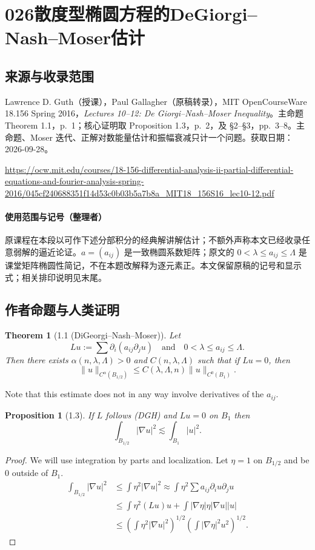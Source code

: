 \documentclass[UTF8,11pt]{ctexart}
\newtheorem*{theorem}{Theorem}
\newtheorem*{proposition}{Proposition}
\theoremstyle{definition}
\begin{document}
\section*{026\quad 散度型椭圆方程的DeGiorgi--Nash--Moser估计}
\subsection*{来源与收录范围}
Lawrence D. Guth（授课），Paul Gallagher（原稿转录），MIT OpenCourseWare 18.156 Spring 2016，\emph{Lectures 10--12: De Giorgi--Nash--Moser Inequality}。主命题 Theorem 1.1，p.~1；核心证明取 Proposition 1.3，p.~2，及 \S2--\S3，pp.~3--8。主命题、Moser 迭代、正解对数能量估计和振幅衰减只计一个问题。获取日期：2026-09-28。
\par\url{https://ocw.mit.edu/courses/18-156-differential-analysis-ii-partial-differential-equations-and-fourier-analysis-spring-2016/045cf240688351f14d53c0b03b5a7b8a_MIT18_156S16_lec10-12.pdf}
\paragraph{使用范围与记号（整理者）} 原课程在本段以可作下述分部积分的经典解讲解估计；不额外声称本文已经收录任意弱解的逼近论证。$a=(a_{ij})$ 是一致椭圆系数矩阵；原文的 $0<\lambda\leq a_{ij}\leq\Lambda$ 是课堂矩阵椭圆性简记，不在本题改解释为逐元素正。本文保留原稿的记号和显示式；相关排印说明见末尾。
\subsection*{作者命题与人类证明}
\begin{theorem}[1.1 (DiGeorgi--Nash--Moser)]
Let
\[Lu:=\sum\partial_i(a_{ij}\partial_j u)\quad\text{and}\quad0<\lambda\leq a_{ij}\leq\Lambda.\tag{DGH}\]
Then there exists $\alpha(n,\lambda,\Lambda)>0$ and $C(n,\lambda,\Lambda)$ such that if $Lu=0$, then
\[\|u\|_{C^\alpha(B_{1/2})}\leq C(\lambda,\Lambda,n)\|u\|_{C^0(B_1)}.\]
\end{theorem}
Note that this estimate does not in any way involve derivatives of the $a_{ij}$.
\begin{proposition}[1.3]
If $L$ follows (DGH) and $Lu=0$ on $B_1$ then
\[\int_{B_{1/2}}|\nabla u|^2\lesssim\int_{B_1}|u|^2.\]
\end{proposition}
\begin{proof}
We will use integration by parts and localization. Let $\eta=1$ on $B_{1/2}$ and be $0$ outside of $B_1$.
\begin{align*}
\int_{B_{1/2}}|\nabla u|^2&\leq\int\eta^2|\nabla u|^2\approx\int\eta^2\sum a_{ij}\partial_i u\partial_j u\\
&\leq\int\eta^2(Lu)u+\int|\nabla\eta|\eta|\nabla u||u|\\
&\leq\left(\int\eta^2|\nabla u|^2\right)^{1/2}\left(\int|\nabla\eta|^2u^2\right)^{1/2}.
\end{align*}
\end{proof}
\end{document}
